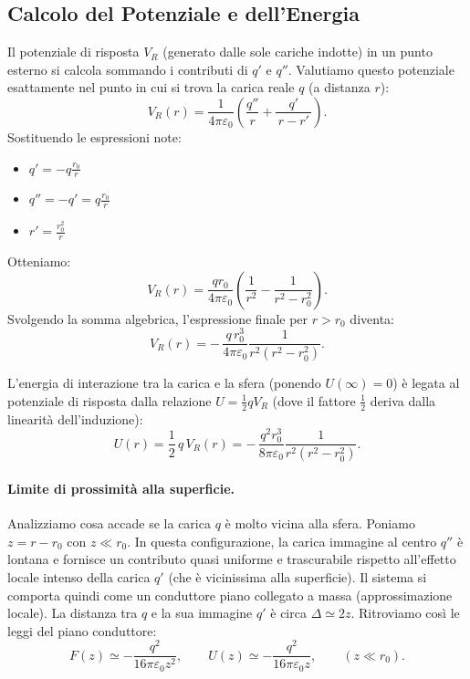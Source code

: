 \documentclass{book}
\begin{document}
\subsection*{Calcolo del Potenziale e dell'Energia}
Il potenziale di risposta \(V_R\) (generato dalle sole cariche indotte) in un punto esterno si calcola sommando i contributi di \(q'\) e \(q''\).
Valutiamo questo potenziale esattamente nel punto in cui si trova la carica reale \(q\) (a distanza \(r\)):
\[
V_R(r)=\frac{1}{4\pi\varepsilon_0}\left(\frac{q''}{r}+\frac{q'}{\,r-r'\,}\right).
\]
Sostituendo le espressioni note:
\begin{itemize}
    \item $q'=-q\frac{r_0}{r}$
    \item $q'' = -q' = q\frac{r_0}{r}$
    \item $r'=\frac{r_0^2}{r}$
\end{itemize}
Otteniamo:
\[
V_R(r)=\frac{q r_0}{4\pi\varepsilon_0}\!\left(\frac{1}{r^2}-\frac{1}{r^2-r_0^2}\right).
\]
Svolgendo la somma algebrica, l'espressione finale per \(r>r_0\) diventa:
\[
V_R(r) = -\,\frac{q\,r_0^3}{4\pi\varepsilon_0}\frac{1}{r^2(r^2-r_0^2)}.
\]

L'energia di interazione tra la carica e la sfera (ponendo \(U(\infty)=0\)) è legata al potenziale di risposta dalla relazione \(U = \frac{1}{2}qV_R\) (dove il fattore \(\frac{1}{2}\) deriva dalla linearità dell'induzione):
\[
U(r)=\frac{1}{2}\,q\,V_R(r)
= -\,\frac{q^2 r_0^3}{8\pi\varepsilon_0}\frac{1}{r^2(r^2-r_0^2)}.
\]

\paragraph{Limite di prossimità alla superficie.}
Analizziamo cosa accade se la carica \(q\) è molto vicina alla sfera. Poniamo \(z = r-r_0\) con \(z \ll r_0\).
In questa configurazione, la carica immagine al centro \(q''\) è lontana e fornisce un contributo quasi uniforme e trascurabile rispetto all'effetto locale intenso della carica \(q'\) (che è vicinissima alla superficie).
Il sistema si comporta quindi come un conduttore piano collegato a massa (approssimazione locale). La distanza tra \(q\) e la sua immagine \(q'\) è circa \(\Delta \simeq 2z\). Ritroviamo così le leggi del piano conduttore:
\[
F(z)\simeq -\frac{q^2}{16\pi\varepsilon_0 z^2},\qquad
U(z)\simeq -\frac{q^2}{16\pi\varepsilon_0 z},\qquad (z\ll r_0).
\]
\end{document}
